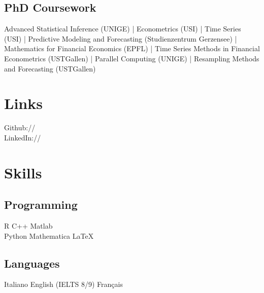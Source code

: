 \documentclass[]{deedy-resume-openfont}
\begin{document}
\begin{minipage}[t]{0.33\textwidth}
\subsection{PhD Coursework}
Advanced Statistical Inference (UNIGE) |
Econometrics (USI) |
Time Series (USI) |
Predictive Modeling and Forecasting (Studienzentrum Gerzensee) |
Mathematics for Financial Economics (EPFL) |
Time Series Methods in Financial Econometrics (USTGallen) |
Parallel Computing (UNIGE) |
Resampling Methods and Forecasting (USTGallen)
\sectionsep


\section{Links}
Github:// \href{https://github.com/qualbialbi}{} \\
LinkedIn:// \href{https://www.linkedin.com/in/alberto-quaini-18b709a9/}{} \\
\sectionsep



\section{Skills}
\subsection{Programming}
R \textbullet{} C++ \textbullet{} Matlab \\
Python \textbullet{} Mathematica \textbullet{} \LaTeX\ \\ 
\sectionsep

\subsection{Languages}
Italiano \textbullet{} English (IELTS 8/9)\textbullet{} Français

%
%

\end{minipage} 
\hfill
\end{document}
